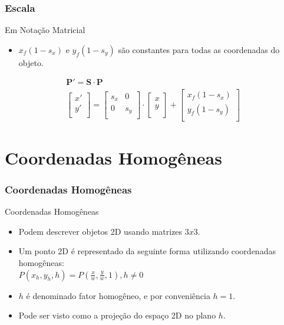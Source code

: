 \documentclass{beamer}
\begin{document}
\begin{frame}
\frametitle{Escala}
	
	\begin{block}{Em Notação Matricial}
		\begin{itemize}
			\item $x_f(1-s_x)$ e $y_f(1-s_y)$ são constantes para todas as coordenadas do objeto.
		\end{itemize}			
	\begin{eqnarray*}
			\textbf{P}' = \textbf{S} \cdot \textbf{P} \\
			\begin{bmatrix} 
					x' \\
					y' \\
			\end{bmatrix}
			=	\begin{bmatrix}
					s_x & 0 \\
					0 & s_y\\
					\end{bmatrix}
			\cdot \begin{bmatrix}
					x \\
					y \\
				\end{bmatrix}
			+ \begin{bmatrix}
					x_f(1-s_x) \\
					y_f(1-s_y) \\
				\end{bmatrix}
	\end{eqnarray*}
	\end{block}
	
\end{frame}

\section{Coordenadas Homogêneas}
\begin{frame}
\frametitle{Coordenadas Homogêneas}
	
	\begin{block}{Coordenadas Homogêneas}
		\begin{itemize}
			\item Podem descrever objetos 2D usando matrizes $3x3$.
			\item Um ponto 2D é representado da seguinte forma utilizando coordenadas homogêneas:\\
				$P(x_h,y_h,h) = P(\frac{x}{w},\frac{y}{w},1), h \neq 0 $
			\item 	$h$ é denominado fator homogêneo, e por conveniência $ h=1$.
			\item Pode ser visto como a projeção do espaço 2D no plano $h$.
		\end{itemize}
	\end{block}
	
\end{frame}
\end{document}
